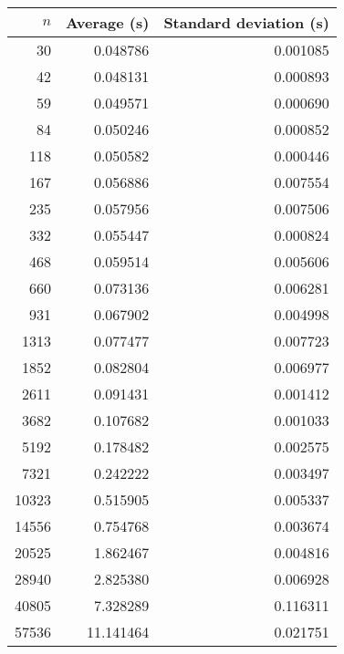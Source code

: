 \begin{tabular}{rrr}
$n$ & Average (s) & Standard deviation (s)\\\hline
30 & 0.048786 & 0.001085\\
42 & 0.048131 & 0.000893\\
59 & 0.049571 & 0.000690\\
84 & 0.050246 & 0.000852\\
118 & 0.050582 & 0.000446\\
167 & 0.056886 & 0.007554\\
235 & 0.057956 & 0.007506\\
332 & 0.055447 & 0.000824\\
468 & 0.059514 & 0.005606\\
660 & 0.073136 & 0.006281\\
931 & 0.067902 & 0.004998\\
1313 & 0.077477 & 0.007723\\
1852 & 0.082804 & 0.006977\\
2611 & 0.091431 & 0.001412\\
3682 & 0.107682 & 0.001033\\
5192 & 0.178482 & 0.002575\\
7321 & 0.242222 & 0.003497\\
10323 & 0.515905 & 0.005337\\
14556 & 0.754768 & 0.003674\\
20525 & 1.862467 & 0.004816\\
28940 & 2.825380 & 0.006928\\
40805 & 7.328289 & 0.116311\\
57536 & 11.141464 & 0.021751\\
\end{tabular}
